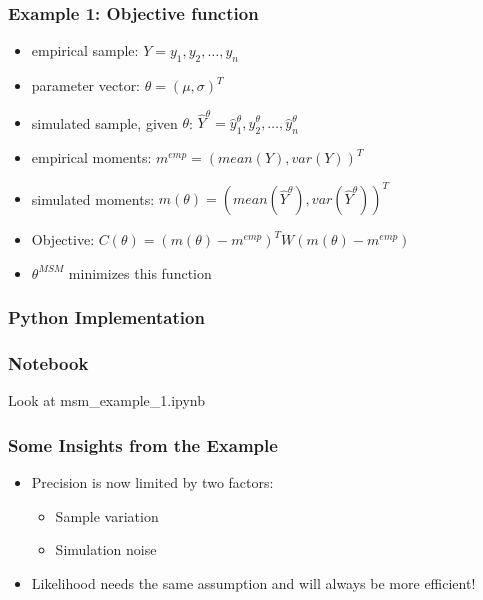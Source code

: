 \documentclass[11pt]{beamer}
\begin{document}
\begin{frame}[c]\frametitle{Example 1: Objective function}
    \begin{itemize}
         \item empirical sample: $Y = y_1, y_2, \ldots, y_n$
         \item parameter vector: $\theta = (\mu, \sigma)^T$
         \item simulated sample, given $\theta$: $\hat{Y}^{\theta} = \hat{y}_1^{\theta}, \hat{y}_2^{\theta}, \ldots, \hat{y}_n^{\theta}$
         \item empirical moments: $m^{emp} = (mean(Y), var(Y))^T$
         \item simulated moments:  $m(\theta) = (mean(\hat{Y}^{\theta}), var(\hat{Y}^{\theta}))^T$
         \item Objective: $C(\theta) = (m(\theta) - m^{emp})^T W (m(\theta) - m^{emp})$
         \item $\theta^{MSM}$ minimizes this function
     \end{itemize}
\end{frame}




\begin{frame}[c]\frametitle{Python Implementation}
    \exampleCode
\end{frame}



\begin{frame}[c]\frametitle{Notebook}
    Look at msm\_example\_1.ipynb
\end{frame}





\begin{frame}[c]\frametitle{Some Insights from the Example}
    \begin{itemize}
        \item Precision is now limited by two factors:
        \begin{itemize}
            \item Sample variation
            \item Simulation noise
        \end{itemize}
        \item Likelihood needs the same assumption and will always be more efficient!
    \end{itemize}
\end{frame}
\end{document}
